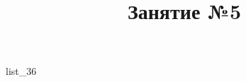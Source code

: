 \documentclass[12pt, a4paper]{article}
\begin{document}
	\title{Занятие №5}
	{list_36}
\end{document}
